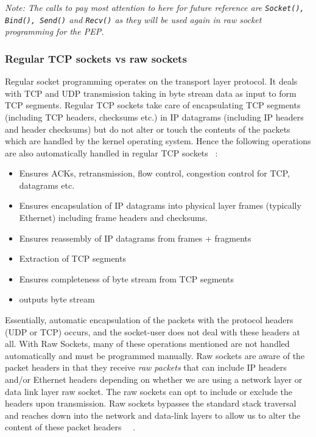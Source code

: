 \noindent \emph{Note: The calls to pay most attention to here for future reference are {\tt Socket(), Bind(), Send()} and {\tt Recv()} as they will be used again in raw socket programming for the PEP.} 

\subsubsection{Regular TCP sockets vs raw sockets}
Regular socket programming operates on the transport layer protocol. It deals with TCP and UDP transmission taking in byte stream data as input to form TCP segments. Regular TCP sockets take care of encapsulating TCP segments (including TCP headers, checksums etc.) in IP datagrams (including IP headers and header checksums) but do not alter or touch the contents of the packets which are handled by the kernel operating system. Hence the following operations are also automatically handled in regular TCP sockets ~\cite{35}:\\

\begin{itemize}
\item Ensures ACKs, retransmission, flow control, congestion control for TCP, datagrams etc.
\item Ensures encapsulation of IP datagrams into physical layer frames (typically Ethernet) including frame headers and checksums.
\item Ensures reassembly of IP datagrams from frames + fragments
\item Extraction of TCP segments
\item Ensures completeness of byte stream from TCP segments
\item outputs byte stream \\
\end{itemize}

Essentially, automatic encapsulation of the packets with the protocol headers (UDP or TCP) occurs, and the socket-user does not deal with these headers at all. With Raw Sockets, many of these operations mentioned are not handled automatically and must be programmed manually. Raw sockets are aware of the packet headers in that they receive \emph{raw packets} that can include IP headers and/or Ethernet headers depending on whether we are using a network layer or data link layer raw socket. The raw sockets can opt to include or exclude the headers upon transmission. Raw sockets bypasses the standard stack traversal and reaches down into the network and data-link layers to allow us to alter the content of these packet headers ~\cite{35}~\cite{38}.\\


